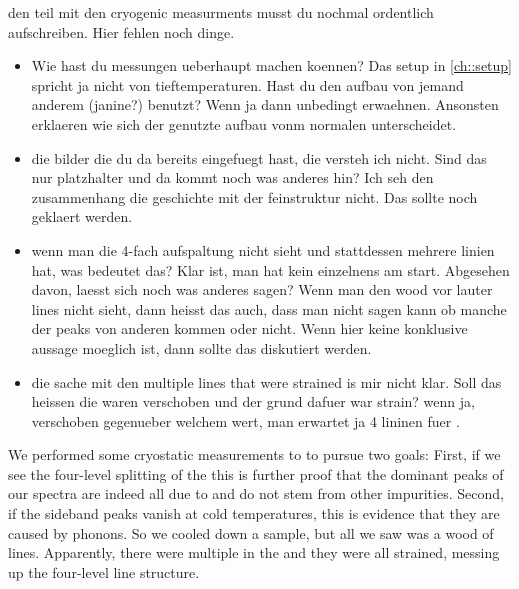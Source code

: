 			\begin{remark}

				den teil mit den cryogenic measurments musst du nochmal ordentlich aufschreiben. Hier fehlen noch dinge.

				\begin{itemize}
					\item Wie hast du messungen ueberhaupt machen koennen? Das setup in \autoref{ch::setup} spricht ja nicht von tieftemperaturen. Hast du den aufbau von jemand anderem (janine?) benutzt? Wenn ja dann unbedingt erwaehnen. Ansonsten erklaeren wie sich der genutzte aufbau vonm normalen unterscheidet.
					\item die bilder die du da bereits eingefuegt hast, die versteh ich  nicht. Sind das nur platzhalter und da kommt noch was anderes hin? Ich seh den zusammenhang die geschichte mit der feinstruktur nicht. Das sollte noch geklaert werden.
					\item wenn man die 4-fach aufspaltung nicht sieht und stattdessen mehrere linien hat, was bedeutet das? Klar ist, man hat kein einzelnens \siv am start. Abgesehen davon, laesst sich noch was anderes sagen? Wenn man den wood vor lauter lines nicht sieht, dann heisst das auch, dass man nicht sagen kann ob manche der \psb peaks von anderen \sivs kommen oder nicht. Wenn hier keine konklusive aussage moeglich ist, dann sollte das diskutiert werden. 
					\item die sache mit den multiple lines that were strained is mir nicht klar. Soll das heissen die waren verschoben und der grund dafuer war strain? wenn ja, verschoben gegenueber welchem wert, man erwartet ja 4 lininen fuer \sivs.
				\end{itemize}
			\end{remark}

			We performed some cryostatic measurements to to pursue two goals:
			First, if we see the four-level splitting of the \ZPL this is further proof that the dominant peaks of our spectra are indeed all due to \sivs and do not stem from other impurities.
			Second, if the sideband peaks vanish at cold temperatures, this is evidence that they are caused by phonons.
			So we cooled down a sample, but all we saw was a wood of lines.
			Apparently, there were multiple \sivs in the \nds and they were all strained, messing up the four-level line structure.
